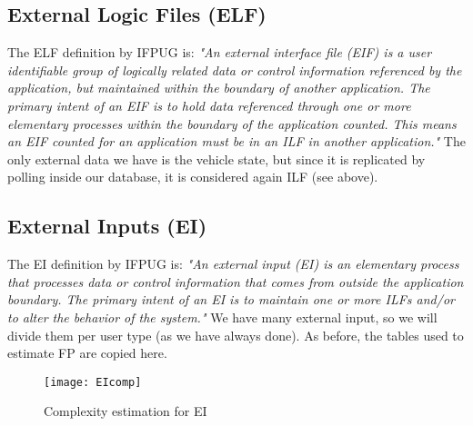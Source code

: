 \subsection{External Logic Files (ELF)}
The ELF definition by IFPUG is: \bigbreak
\textit{"An external interface file (EIF) is a user identifiable group of logically related data or control information referenced by the application, but maintained within the boundary of another application. The primary intent of an EIF is to hold data referenced through one or more elementary processes within the boundary of the application counted. This means an EIF counted for an application must be in an ILF in another application."}
\bigbreak
The only external data we have is the vehicle state, but since it is replicated by polling inside our database, it is considered again ILF (see above). 

\subsection{External Inputs (EI)}
The EI definition by IFPUG is: \bigbreak
\textit{"An external input (EI) is an elementary process that processes data or control information that comes from outside the application boundary. The primary intent of an EI is to maintain one or more ILFs and/or to alter the behavior of the system."}
\bigbreak
We have many external input, so we will divide them per user type (as we have always done). As before, the tables used to estimate FP are copied here.
\begin{figure}
  \centering
  \texttt{[image: EIcomp]}
  \caption{Complexity estimation for EI}
\end{figure}

